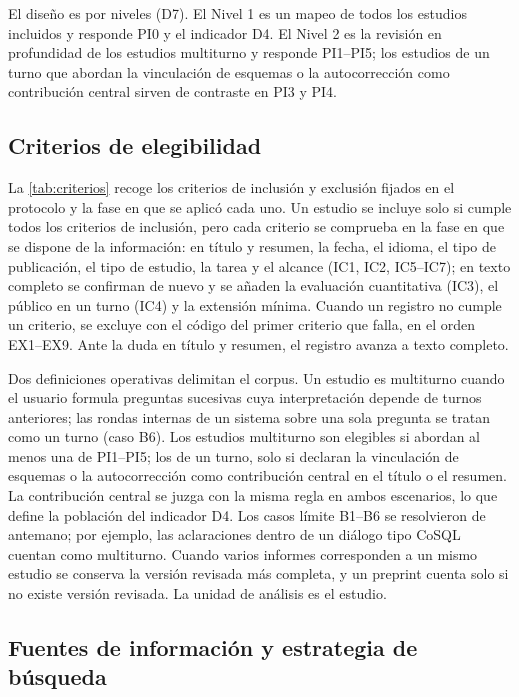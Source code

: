 El diseño es por niveles (D7). El Nivel 1 es un mapeo de todos los estudios incluidos y responde PI0 y el indicador D4. El Nivel 2 es la revisión en profundidad de los estudios multiturno y responde PI1–PI5; los estudios de un turno que abordan la vinculación de esquemas o la autocorrección como contribución central sirven de contraste en PI3 y PI4.

\subsection{Criterios de elegibilidad}
\label{sec:met-elegibilidad}



La \cref{tab:criterios} recoge los criterios de inclusión y exclusión fijados en el protocolo y la fase en que se aplicó cada uno. Un estudio se incluye solo si cumple todos los criterios de inclusión, pero cada criterio se comprueba en la fase en que se dispone de la información: en título y resumen, la fecha, el idioma, el tipo de publicación, el tipo de estudio, la tarea y el alcance (IC1, IC2, IC5--IC7); en texto completo se confirman de nuevo y se añaden la evaluación cuantitativa (IC3), el  público en un turno (IC4) y la extensión mínima. Cuando un registro no cumple un criterio, se excluye con el código del primer criterio que falla, en el orden EX1--EX9. Ante la duda en título y resumen, el registro avanza a texto completo.

Dos definiciones operativas delimitan el corpus. Un estudio es multiturno cuando el usuario formula preguntas sucesivas cuya interpretación depende de turnos anteriores; las rondas internas de un sistema sobre una sola pregunta se tratan como un turno (caso B6). Los estudios multiturno son elegibles si abordan al menos una de PI1–PI5; los de un turno, solo si declaran la vinculación de esquemas o la autocorrección como contribución central en el título o el resumen. La contribución central se juzga con la misma regla en ambos escenarios, lo que define la población del indicador D4. Los casos límite B1–B6 se resolvieron de antemano; por ejemplo, las aclaraciones dentro de un diálogo tipo CoSQL cuentan como multiturno. Cuando varios informes corresponden a un mismo estudio se conserva la versión revisada más completa, y un preprint cuenta solo si no existe versión revisada. La unidad de análisis es el estudio.

\subsection{Fuentes de información y estrategia de búsqueda}
\label{sec:met-busqueda}


